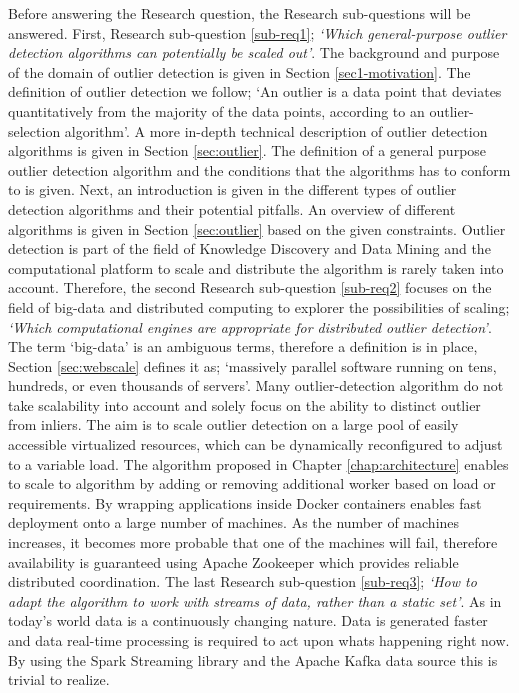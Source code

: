 Before answering the Research question, the Research sub-questions will be answered. First, Research sub-question \ref{sub-req1}; \emph{`Which general-purpose outlier detection algorithms can potentially be scaled out'}. The background and purpose of the domain of outlier detection is given in Section \ref{sec1-motivation}. The definition of outlier detection we follow; `An outlier is a data point that deviates quantitatively from the majority of the data points, according to an outlier-selection algorithm'. A more in-depth technical description of outlier detection algorithms is given in Section \ref{sec:outlier}. The definition of a general purpose outlier detection algorithm and the conditions that the algorithms has to conform to is given. Next, an introduction is given in the different types of outlier detection algorithms and their potential pitfalls. An overview of different algorithms is given in Section \ref{sec:outlier} based on the given constraints. 
Outlier detection is part of the field of Knowledge Discovery and Data Mining and the computational platform to scale and distribute the algorithm is rarely taken into account. Therefore, the second Research sub-question \ref{sub-req2} focuses on the field of big-data and distributed computing to explorer the possibilities of scaling; \emph{`Which computational engines are appropriate for distributed outlier detection'}. The term `big-data' is an ambiguous terms, therefore a definition is in place, Section \ref{sec:webscale} defines it as; `massively parallel software running on tens, hundreds, or even thousands of servers'. Many  outlier-detection algorithm do not take scalability into account and solely focus on the ability to distinct outlier from inliers. The aim is to scale outlier detection on a large pool of easily accessible virtualized resources, which can be dynamically reconfigured to adjust to a variable load. The algorithm proposed in Chapter \ref{chap:architecture} enables to scale to algorithm by adding or removing additional worker based on load or requirements. By wrapping applications inside Docker containers enables fast deployment onto a large number of machines. As the number of machines increases, it becomes more probable that one of the machines will fail, therefore availability is guaranteed using Apache Zookeeper which provides reliable distributed coordination.
The last Research sub-question \ref{sub-req3}; \emph{`How to adapt the algorithm to work with streams of data, rather than a static set'}. As in today's world data is a continuously changing nature. Data is generated faster and data real-time processing is required to act upon whats happening right now. By using the Spark Streaming library and the Apache Kafka data source this is trivial to realize.

